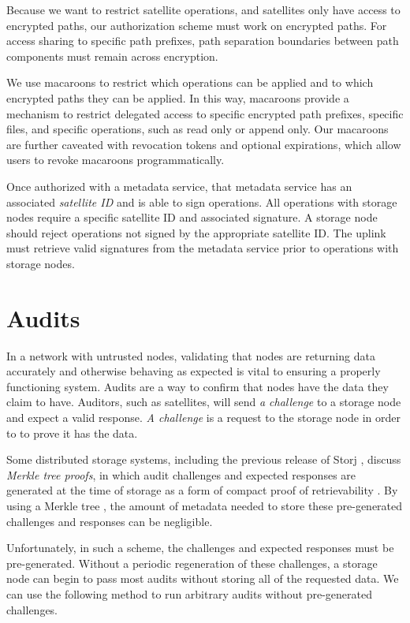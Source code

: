 \documentclass[11pt,fleqn,openany]{book}
\begin{document}
Because we want to restrict satellite operations, and satellites only have access
to encrypted paths, our authorization scheme must work on encrypted paths. For
access sharing to specific path prefixes, path separation boundaries between
path components must remain across encryption.

We use macaroons to restrict which operations can be applied and to which
encrypted paths they can be applied. In this way, macaroons provide a
mechanism to restrict delegated access to specific encrypted path prefixes,
specific files, and specific operations, such as read only or append only.
Our macaroons are further caveated with revocation tokens and optional
expirations, which allow users to revoke macaroons programmatically.

Once authorized with a metadata service, that metadata service has an associated
{\em satellite ID} and is able to sign operations. All
operations with storage nodes require a specific satellite ID and associated
signature. A storage node should reject operations not signed by the appropriate
satellite ID. The uplink must retrieve valid signatures from the metadata
service prior to operations with storage nodes.

\section{Audits}\label{sec:concrete-audits}

In a network with untrusted nodes, validating that nodes are returning data
accurately and otherwise behaving as expected is vital to ensuring a properly
functioning system. Audits are a way to confirm that nodes have the data they
claim to have. Auditors, such as satellites, will send \textit{a challenge} to a
storage node and expect a valid response. \textit{A challenge} is a request to the
storage node in order to to prove it has the data.

Some distributed storage systems, including the previous release of Storj
\cite{storj-v2}, discuss {\em Merkle tree proofs}, in which audit challenges
and expected responses are generated at the time of storage as a form of compact
proof of retrievability \cite{proof-of-retrievability}. By using a Merkle tree
\cite{merkle-tree}, the amount of metadata needed to store these pre-generated
challenges and responses can be negligible.

Unfortunately, in such a scheme, the challenges and expected responses must be
pre-generated. Without a periodic regeneration of these challenges, a
storage node can begin to pass most audits without storing all of the requested
data. We can use the following method to run arbitrary audits without
pre-generated challenges.
\end{document}
